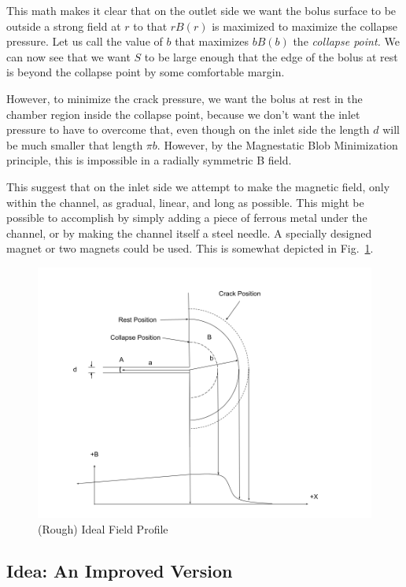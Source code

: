 \documentclass[]{asme2ej}
\begin{document}
This math makes it clear that on the outlet side we want the
bolus surface to be outside a strong field at $r$ to that $r B(r)$ is
maximized to maximize the collapse pressure.
Let us call the value of $b$ that maximizes $b B(b)$ the {\em collapse point.}
We can now see that we want $S$ to be large enough that the edge
of the bolus at rest is beyond the collapse point by some
comfortable margin.

However, to minimize the crack pressure, we want the bolus at rest
in the chamber region inside
the collapse point, because we don't want the inlet pressure to have
to overcome that, even though on the inlet side the length $d$ will
be much smaller that length $\pi b$. However, by the
Magnestatic Blob Minimization principle, this is impossible in a
radially symmetric B field.

This suggest that on the inlet side we attempt to make
the magnetic field, only within the channel, as gradual, linear, and
long as possible. This might be possible to accomplish by simply adding
a piece of ferrous metal under the channel, or by making the channel
itself a steel needle. A specially designed magnet or two magnets could be
used. This is somewhat depicted in Fig.~\ref{fig:ifp}.

\begin{figure}
\centerline{\includegraphics[width=6in]{figure/IdealFieldProfile.png}}
\caption{(Rough) Ideal Field Profile}
\label{fig:ifp}
\end{figure}

\subsection{Idea: An Improved Version}
\end{document}
